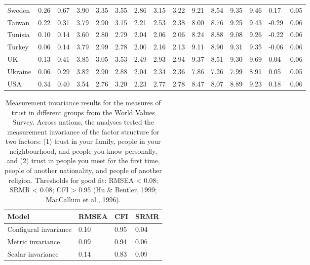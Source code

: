 \documentclass[
  man,floatsintext]{apa6}
\newenvironment{lltable}{\begin{landscape}\centering\begin{ThreePartTable}}{\end{ThreePartTable}\end{landscape}}
\begin{document}
\begin{lltable}
{\begin{longtable}{lllllllllllllll}
Sweden & 0.26 & 0.67 & 3.90 & 3.35 & 3.55 & 2.86 & 3.15 & 3.22 & 9.21 & 8.54 & 9.35 & 9.46 & 0.17 & 0.05\\
Taiwan & 0.22 & 0.31 & 3.79 & 2.90 & 3.15 & 2.21 & 2.53 & 2.38 & 8.00 & 8.76 & 9.25 & 9.43 & -0.29 & 0.06\\
Tunisia & 0.10 & 0.14 & 3.60 & 2.80 & 2.79 & 2.04 & 2.06 & 2.06 & 8.24 & 8.88 & 9.08 & 9.26 & -0.22 & 0.06\\
Turkey & 0.06 & 0.14 & 3.79 & 2.99 & 2.78 & 2.00 & 2.16 & 2.13 & 9.11 & 8.90 & 9.31 & 9.35 & -0.06 & 0.06\\
UK & 0.13 & 0.41 & 3.85 & 3.05 & 3.53 & 2.49 & 2.93 & 2.94 & 9.37 & 8.51 & 9.30 & 9.69 & 0.04 & 0.06\\
Ukraine & 0.06 & 0.29 & 3.82 & 2.90 & 2.88 & 2.04 & 2.34 & 2.36 & 7.86 & 7.26 & 7.99 & 8.91 & 0.05 & 0.05\\
USA & 0.34 & 0.40 & 3.54 & 2.76 & 3.20 & 2.23 & 2.77 & 2.78 & 8.47 & 8.07 & 8.89 & 9.23 & 0.18 & 0.06\\
\bottomrule
\end{longtable}

}

\end{lltable}

\newpage



\begin{table}[h]

\begin{center}
\begin{threeparttable}

\caption{\label{tab:tableInvarianceWVS1}Measurement invariance results for the measures of trust in different groups from the World Values Survey. Across nations, the analyses tested the measurement invariance of the factor structure for two factors: (1) trust in your family, people in your neighbourhood, and people you know personally, and (2) trust in people you meet for the first time, people of another nationality, and people of another religion. Thresholds for good fit: RMSEA \textless{} 0.08; SRMR \textless{} 0.08; CFI \textgreater{} 0.95 (Hu \& Bentler, 1999; MacCallum et al., 1996).}

\begin{tabular}{m{4cm}m{3cm}m{3cm}m{3cm}}
\toprule
Model & \multicolumn{1}{c}{RMSEA} & \multicolumn{1}{c}{CFI} & \multicolumn{1}{c}{SRMR}\\
\midrule
Configural invariance & 0.10 & 0.95 & 0.04\\
Metric invariance & 0.09 & 0.94 & 0.06\\
Scalar invariance & 0.14 & 0.83 & 0.09\\
\bottomrule
\end{tabular}

\end{threeparttable}
\end{center}

\end{table}
\end{document}
